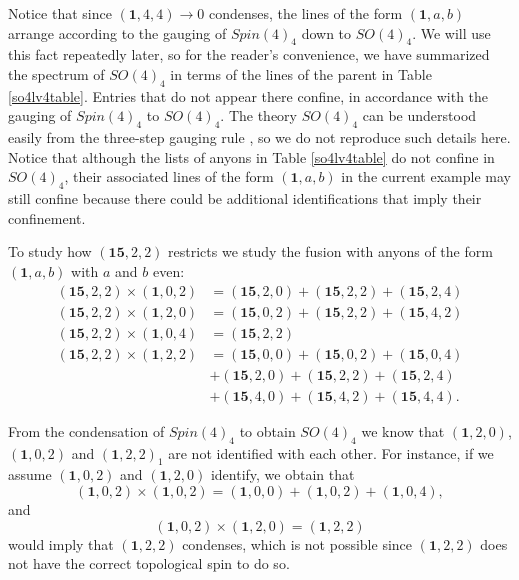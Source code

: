 \documentclass[11pt]{article}
\numberwithin{equation}{section}
\begin{document}
Notice that since $(\mathbf{1},4,4) \to 0$ condenses, the lines of the form $(\mathbf{1},a,b)$ arrange according to the gauging of $Spin(4)_{4}$ down to $SO(4)_{4}$. We will use this fact repeatedly later, so for the reader's convenience, we have summarized the spectrum of $SO(4)_{4}$ in terms of the lines of the parent in Table \ref{so4lv4table}. Entries that do not appear there confine, in accordance with the gauging of $Spin(4)_{4}$ to $SO(4)_{4}$. The theory $SO(4)_{4}$ can be understood easily from the three-step gauging rule \cite{Moore:1989yh, Hsin:2018vcg}, so we do not reproduce such details here. Notice that although the lists of anyons in Table \ref{so4lv4table} do not confine in $SO(4)_{4}$, their associated lines of the form $(\mathbf{1},a,b)$ in the current example may still confine because there could be additional identifications that imply their confinement.

To study how $(\mathbf{15},2,2)$ restricts we study the fusion with anyons of the form $(\mathbf{1},a,b)$ with $a$ and $b$ even:
\begin{align}
    (\mathbf{15},2,2) \times (\mathbf{1},0,2) &= (\mathbf{15},2,0) + (\mathbf{15},2,2) \label{1522fusion102}+ (\mathbf{15},2,4) \\[0.3cm]
    (\mathbf{15},2,2) \times (\mathbf{1},2,0) &= (\mathbf{15},0,2) + (\mathbf{15},2,2) + (\mathbf{15},4,2) \\[0.3cm]
    (\mathbf{15},2,2) \times (\mathbf{1},0,4) &= (\mathbf{15},2,2) \\[0.3cm]
    (\mathbf{15},2,2) \times (\mathbf{1},2,2) &= (\mathbf{15},0,0) + (\mathbf{15},0,2) + (\mathbf{15},0,4) \label{1522fusion122} \\[0.3cm]
    &+(\mathbf{15},2,0) + (\mathbf{15},2,2) + (\mathbf{15},2,4) \nonumber \\[0.3cm]
    &+(\mathbf{15},4,0) + (\mathbf{15},4,2) + (\mathbf{15},4,4). \nonumber
\end{align}


From the condensation of $Spin(4)_{4}$ to obtain $SO(4)_{4}$ we know that $(\mathbf{1},2,0)$, $(\mathbf{1},0,2)$ and $(\mathbf{1},2,2)_{1}$ are not identified with each other. For instance, if we assume $(\mathbf{1},0,2)$ and $(\mathbf{1},2,0)$ identify, we obtain that
\begin{equation}
    (\mathbf{1},0,2) \times (\mathbf{1},0,2) = (\mathbf{1},0,0) + (\mathbf{1},0,2) + (\mathbf{1},0,4),
\end{equation}
and
\begin{equation}
    (\mathbf{1},0,2) \times (\mathbf{1},2,0) = (\mathbf{1},2,2)
\end{equation}
would imply that $(\mathbf{1},2,2)$ condenses, which is not possible since $(\mathbf{1},2,2)$ does not have the correct topological spin to do so.
\end{document}
